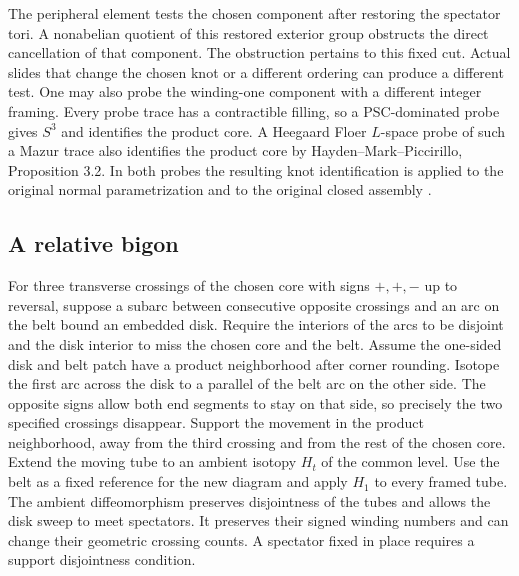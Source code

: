 \documentclass[11pt,letterpaper]{article}
\numberwithin{equation}{section}
\theoremstyle{remark}
\begin{document}
The peripheral element tests the chosen component after restoring
the spectator tori. A nonabelian quotient of this restored
exterior group obstructs the direct cancellation of that component.
The obstruction pertains to this fixed cut. Actual slides that
change the chosen knot or a different ordering can produce a
different test. One may also probe the winding-one component
with a different integer framing. Every probe trace has a
contractible filling, so a PSC-dominated probe gives \(S^3\)
and identifies the product core. A Heegaard Floer \(L\)-space
probe of such a Mazur trace also identifies the product core
by Hayden--Mark--Piccirillo, Proposition 3.2. In both probes
the resulting knot identification is applied to the original
normal parametrization and to the original closed assembly
\cite[Proposition 3.2]{HaydenMarkPiccirillo2021Mazur}.

\subsection{A relative bigon}
For three transverse crossings of the chosen core with signs
\(+,+,-\) up to reversal, suppose a subarc between consecutive
opposite crossings and an arc on the belt bound an embedded disk.
Require the interiors of the arcs to be disjoint and the disk
interior to miss the chosen core and the belt. Assume the one-sided
disk and belt patch have a product neighborhood after corner
rounding. Isotope the first arc across the disk to a parallel of
the belt arc on the other side. The opposite signs allow both end
segments to stay on that side, so precisely the two specified
crossings disappear. Support the movement in the product
neighborhood, away from the third crossing and from the rest of
the chosen core. Extend the moving tube to an ambient isotopy
\(H_t\) of the common level. Use the belt as a fixed reference
for the new diagram and apply \(H_1\) to every framed tube.
The ambient diffeomorphism preserves disjointness of the tubes
and allows the disk sweep to meet spectators. It preserves their
signed winding numbers and can change their geometric crossing
counts. A spectator fixed in place requires a support disjointness
condition.
\end{document}
